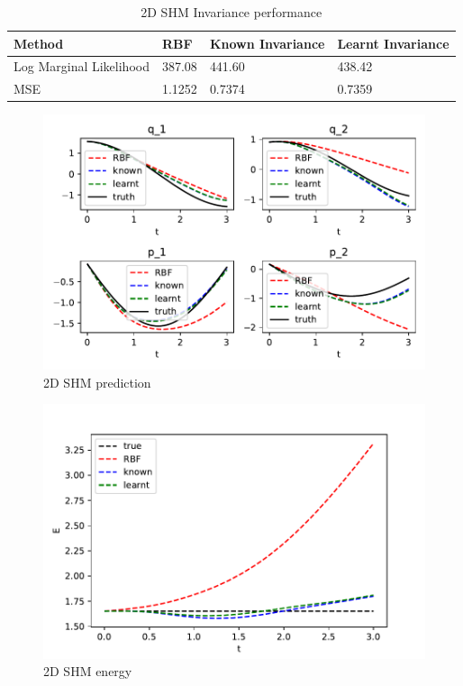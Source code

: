 \documentclass{statsmsc}
\begin{document}
\begin{table}[H]
  \centering
  \begin{tabular}{l l l l}
    \hline
Method           & RBF & Known Invariance&  Learnt Invariance\\
  \hline
Log Marginal Likelihood & 387.08 & 441.60 & 438.42  \\
MSE & 1.1252 & 0.7374 & 0.7359 \\
                    \hline
  \end{tabular}
  \caption{2D SHM Invariance performance}
  \label{tab:SHM_2d_performance}
\end{table}

\begin{figure}[H] 
  \includegraphics[width=0.8\linewidth]{../codes/figures/shm_2d_predicted.pdf}
  \centering
  \caption{2D SHM prediction}
  \label{fig:shm_2d_prediction}
\end{figure}

\begin{figure}[H] 
  \includegraphics[width=0.8\linewidth]{../codes/figures/shm_2d_energy.pdf}
  \centering
  \caption{2D SHM energy}
  \label{fig:shm_2d_energy}
\end{figure}
\end{document}
